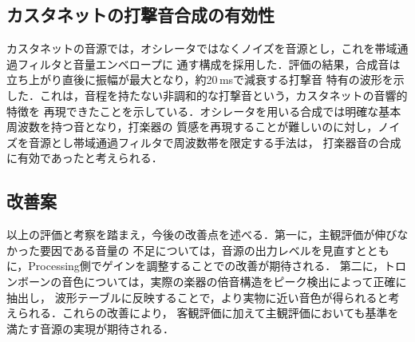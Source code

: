 \subsection{カスタネットの打撃音合成の有効性}
カスタネットの音源では，オシレータではなくノイズを音源とし，これを帯域通過フィルタと音量エンベロープに
通す構成を採用した．評価の結果，合成音は立ち上がり直後に振幅が最大となり，約20\,msで減衰する打撃音
特有の波形を示した．これは，音程を持たない非調和的な打撃音という，カスタネットの音響的特徴を
再現できたことを示している．オシレータを用いる合成では明確な基本周波数を持つ音となり，打楽器の
質感を再現することが難しいのに対し，ノイズを音源とし帯域通過フィルタで周波数帯を限定する手法は，
打楽器音の合成に有効であったと考えられる．

\subsection{改善案}
以上の評価と考察を踏まえ，今後の改善点を述べる．第一に，主観評価が伸びなかった要因である音量の
不足については，音源の出力レベルを見直すとともに，Processing側でゲインを調整することでの改善が期待される．
第二に，トロンボーンの音色については，実際の楽器の倍音構造をピーク検出によって正確に抽出し，
波形テーブルに反映することで，より実物に近い音色が得られると考えられる．これらの改善により，
客観評価に加えて主観評価においても基準を満たす音源の実現が期待される．